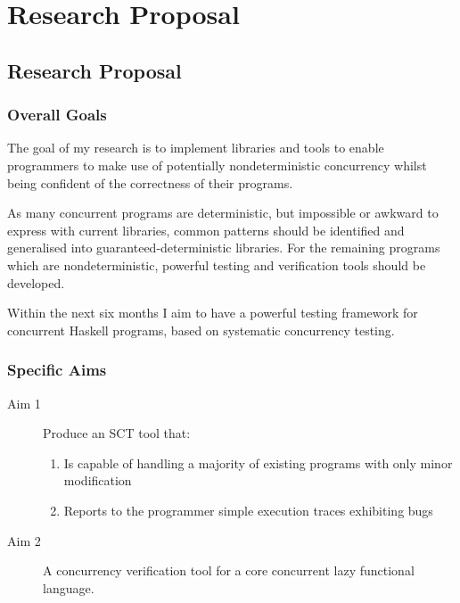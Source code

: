 \part{Research Proposal}


\chapter{Research Proposal}
\label{chp:proposal}


\section{Overall Goals}
\label{sec:proposal-goals}

The goal of my research is to implement libraries and tools to enable
programmers to make use of potentially nondeterministic concurrency
whilst being confident of the correctness of their programs.

As many concurrent programs are deterministic, but impossible or
awkward to express with current libraries, common patterns should be
identified and generalised into guaranteed-deterministic
libraries. For the remaining programs which are nondeterministic,
powerful testing and verification tools should be developed.

Within the next six months I aim to have a powerful testing framework
for concurrent Haskell programs, based on systematic concurrency
testing.

\section{Specific Aims}
\label{sec:proposal-aims}

\begin{description}
  \item[Aim 1] Produce an SCT tool that:
    \begin{enumerate}
      \item Is capable of handling a majority of existing programs with
        only minor modification
      \item Reports to the programmer simple execution traces
        exhibiting bugs
    \end{enumerate}

  \item[Aim 2] A concurrency verification tool for a core concurrent
    lazy functional language.
\end{description}

